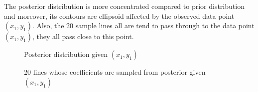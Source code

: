 \documentclass[12pt, fullpage,letterpaper]{article}
\begin{document}
\begin{enumerate}
\begin{enumerate}
{	The posterior distribution is more concentrated compared to prior distribution and moreover, 
	its contours are ellipsoid affected by the observed data point $(x_1,y_1)$. 
	Also, the $20$ sample lines all are tend to pass through to the data point $(x_1,y_1)$, they all pass close to this point. 
	\begin{figure}[H]
	\begin{center}
	\begin{minipage}{0.45\textwidth}
     	\caption{{\footnotesize Posterior distribution given $(x_1,y_1)$}}\label{Fig.2}      
 	\end{minipage}
 	\begin{minipage}{0.45\textwidth}
     	\caption{{\footnotesize 20 lines whose coefficients are sampled from posterior given $(x_1,y_1)$}}\label{Fig.2}      
 	\end{minipage}
	 \end{center}
	\end{figure}
		
}
\end{enumerate}
\end{enumerate}
\end{document}
